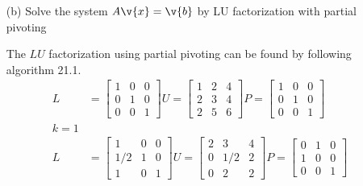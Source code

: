 \documentclass[11pt]{article}
\begin{document}
\begin{enumerate}
\begin{enumerate}
            \item[(b)] %
                Solve the system $A\v{x} = \v{b}$ by LU factorization with
                partial pivoting

                The $LU$ factorization using partial pivoting can be found by
                following algorithm 21.1.
                \begin{align*}
                    L &=
                    \begin{bmatrix}
                        1 & 0 & 0 \\
                        0 & 1 & 0 \\
                        0 & 0 & 1
                    \end{bmatrix}
                    U =
                    \begin{bmatrix}
                        1 & 2 & 4 \\
                        2 & 3 & 4 \\
                        2 & 5 & 6
                    \end{bmatrix}
                    P =
                    \begin{bmatrix}
                        1 & 0 & 0 \\
                        0 & 1 & 0 \\
                        0 & 0 & 1
                    \end{bmatrix} \\
                    k = 1 \\
                    L &=
                    \begin{bmatrix}
                        1 & 0 & 0 \\
                        1/2 & 1 & 0 \\
                        1 & 0 & 1
                    \end{bmatrix}
                    U =
                    \begin{bmatrix}
                        2 & 3 & 4 \\
                        0 & 1/2 & 2 \\
                        0 & 2 & 2
                    \end{bmatrix}
                    P =
                    \begin{bmatrix}
                        0 & 1 & 0 \\
                        1 & 0 & 0 \\
                        0 & 0 & 1

\end{bmatrix}
\end{align*}
\end{enumerate}
\end{enumerate}
\end{document}
